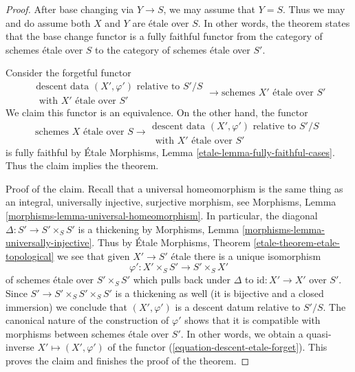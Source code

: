 \begin{proof}
After base changing via $Y \to S$, we may assume that $Y = S$.
Thus we may and do assume both $X$ and $Y$ are \'etale over $S$.
In other words, the theorem states that the base change functor
is a fully faithful functor from the category of schemes \'etale
over $S$ to the category of schemes \'etale over $S'$.

\medskip\noindent
Consider the forgetful functor
\begin{equation}
\label{equation-descent-etale-forget}
\begin{matrix}
\text{descent data }(X', \varphi')\text{ relative to }S'/S \\
\text{ with }X'\text{ \'etale over }S'
\end{matrix}
\longrightarrow
\text{schemes }X'\text{ \'etale over }S'
\end{equation}
We claim this functor is an equivalence. On the other hand, the
functor
\begin{equation}
\label{equation-descent-etale}
\text{schemes }X\text{ \'etale over }S \longrightarrow
\begin{matrix}
\text{descent data }(X', \varphi')\text{ relative to }S'/S \\
\text{ with }X'\text{ \'etale over }S'
\end{matrix}
\end{equation}
is fully faithful by \'Etale Morphisms, Lemma
\ref{etale-lemma-fully-faithful-cases}.
Thus the claim implies the theorem.

\medskip\noindent
Proof of the claim.
Recall that a universal homeomorphism is the same thing as an
integral, universally injective, surjective morphism, see
Morphisms, Lemma \ref{morphisms-lemma-universal-homeomorphism}.
In particular, the diagonal $\Delta : S' \to S' \times_S S'$ is a thickening
by Morphisms, Lemma \ref{morphisms-lemma-universally-injective}.
Thus by \'Etale Morphisms, Theorem
\ref{etale-theorem-etale-topological}
we see that given $X' \to S'$ \'etale there is a unique isomorphism
$$
\varphi' : X' \times_S S' \to S' \times_S X'
$$
of schemes \'etale over $S' \times_S S'$ which pulls back under
$\Delta$ to $\text{id} : X' \to X'$ over $S'$.
Since $S' \to S' \times_S S' \times_S S'$
is a thickening as well (it is bijective and a closed immersion)
we conclude that $(X', \varphi')$ is a descent datum relative to $S'/S$.
The canonical nature of the construction of $\varphi'$ shows
that it is compatible with morphisms between schemes \'etale over $S'$.
In other words, we obtain a quasi-inverse
$X' \mapsto (X', \varphi')$ of the functor
(\ref{equation-descent-etale-forget}). This proves the claim and
finishes the proof of the theorem.
\end{proof}

